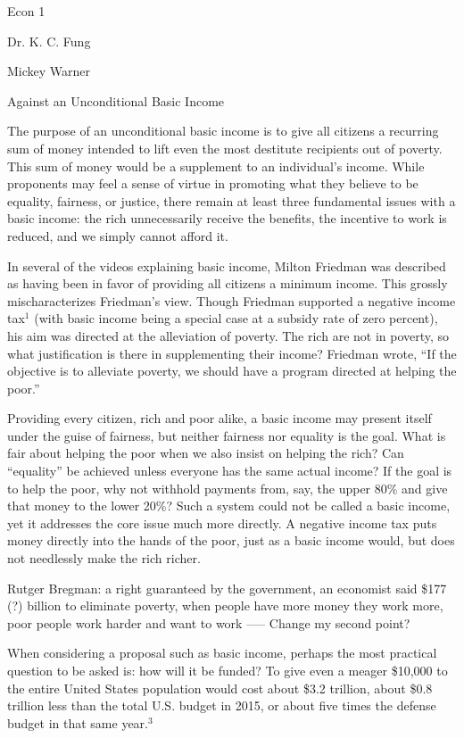 \documentclass[12pt]{article}
\begin{document}
\noindent Econ 1

\noindent Dr. K. C. Fung
\bigskip

\noindent Mickey Warner

\begin{center}
Against an Unconditional Basic Income
\end{center}

The purpose of an unconditional basic income is to give all citizens a recurring sum of money intended to lift even the most destitute recipients out of poverty. This sum of money would be a supplement to an individual's income. While proponents may feel a sense of virtue in promoting what they believe to be equality, fairness, or justice, there remain at least three fundamental issues with a basic income: the rich unnecessarily receive the benefits, the incentive to work is reduced, and we simply cannot afford it.

In several of the videos explaining basic income, Milton Friedman was described as having been in favor of providing all citizens a minimum income. This grossly mischaracterizes Friedman's view. Though Friedman supported a negative income tax$^1$ (with basic income being a special case at a subsidy rate of zero percent), his aim was directed at the alleviation of poverty. The rich are not in poverty, so what justification is there in supplementing their income? Friedman wrote, ``If the objective is to alleviate poverty, we should have a program directed at helping the poor.''

Providing every citizen, rich and poor alike, a basic income may present itself under the guise of fairness, but neither fairness nor equality is the goal. What is fair about helping the poor when we also insist on helping the rich? Can ``equality'' be achieved unless everyone has the same actual income? If the goal is to help the poor, why not withhold payments from, say, the upper 80\% and give that money to the lower 20\%? Such a system could not be called a basic income, yet it addresses the core issue much more directly. A negative income tax puts money directly into the hands of the poor, just as a basic income would, but does not needlessly make the rich richer.

Rutger Bregman: a right guaranteed by the government, an economist said \$177 (?) billion to eliminate poverty, when people have more money they work more, poor people work harder and want to work  ----- Change my second point?

When considering a proposal such as basic income, perhaps the most practical question to be asked is: how will it be funded? To give even a meager \$10,000 to the entire United States population would cost about \$3.2 trillion, about \$0.8 trillion less than the total U.S. budget in 2015, or about five times the defense budget in that same year.$^3$
\end{document}
